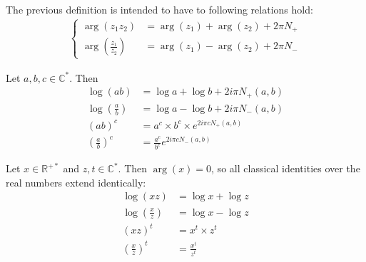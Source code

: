\documentclass[../main.tex]{subfiles}
\begin{document}
\begin{remark}
	The previous definition is intended to have to following relations hold:
	\begin{align*}
	\begin{cases}
	\arg(z_1 z_2) &= \arg (z_1) + \arg (z_2) + 2\pi N_+\\
	\arg \left(\frac{z_1}{z_2}\right) &= \arg (z_1) - \arg (z_2) + 2\pi N_-
	\end{cases}
	\end{align*}
\end{remark}

\begin{prop}{}
	Let $a, b, c \in \mathbb{C}^*$. Then
	\begin{align*}
		\log (a b) &= \log a + \log b + 2 i \pi N_+ (a, b)\\
		\log \left(\frac{a}{b}\right) &=  \log a - \log b + 2 i \pi N_- (a, b)\\
		{(a b)}^c &= a^c \times b^c \times e^{2i\pi c N_+(a, b)}\\
		{\left(\frac{a}{b}\right)}^c &= \frac{a^c}{b^c} e^{2i\pi c N_-(a, b)}
	\end{align*}
\end{prop}

\begin{cor}{}\label{cor_log_identities}
	Let $x \in \mathbb{R}^{+*}$ and $z,t \in \mathbb{C}^*$. Then $\arg(x) = 0$, so all classical identities over the real numbers extend identically:
	\begin{align*}
	\log (xz) &= \log x + \log z\\
	\log \left(\frac{x}{z}\right) &=  \log x - \log z\\
	{(x z)}^t &= x^t \times z^t\\
	{\left(\frac{x}{z}\right)}^t &= \frac{x^t}{z^t}
	\end{align*}
\end{cor}

%
%	
%
%	
%	
%
\end{document}
